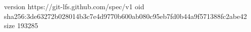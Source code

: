 version https://git-lfs.github.com/spec/v1
oid sha256:3de63272b028014b3c7e4d9770b600ab080c95eb7fd0b44a9f571388fc2abe42
size 193285
